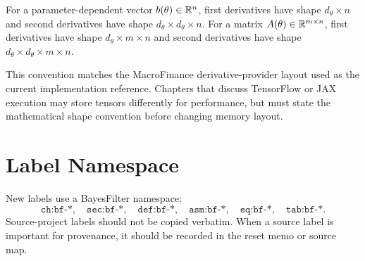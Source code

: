 For a parameter-dependent vector $b(\theta)\in\mathbb{R}^n$, first derivatives have
shape $d_\theta \times n$ and second derivatives have shape
$d_\theta \times d_\theta \times n$.  For a matrix
$A(\theta)\in\mathbb{R}^{m\times n}$, first derivatives have shape
$d_\theta \times m \times n$ and second derivatives have shape
$d_\theta \times d_\theta \times m \times n$.

This convention matches the MacroFinance derivative-provider layout used as the
current implementation reference.  Chapters that discuss TensorFlow or JAX
execution may store tensors differently for performance, but must state the
mathematical shape convention before changing memory layout.

\section{Label Namespace}
\label{sec:bf-label-namespace}

New labels use a BayesFilter namespace:
\[
  \texttt{ch:bf-*},\quad
  \texttt{sec:bf-*},\quad
  \texttt{def:bf-*},\quad
  \texttt{asm:bf-*},\quad
  \texttt{eq:bf-*},\quad
  \texttt{tab:bf-*}.
\]
Source-project labels should not be copied verbatim.  When a source label is
important for provenance, it should be recorded in the reset memo or source map.
